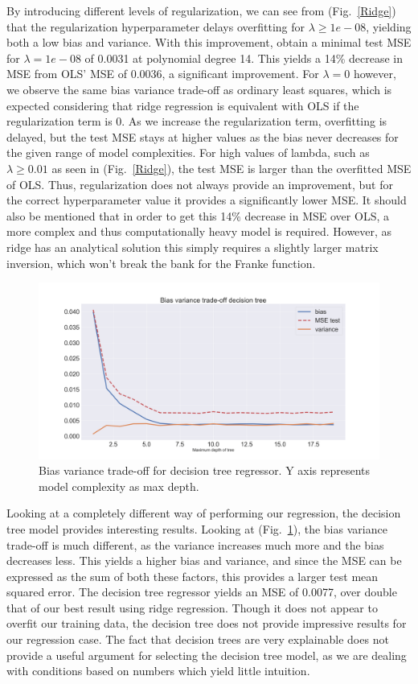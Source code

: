 \documentclass[onecolumn,10pt,cleanfoot]{asme2ej}
\begin{document}
By introducing different levels of regularization, we can see from (Fig.~\ref{Ridge}) that the regularization hyperparameter delays overfitting for $\lambda \geq 1e-08$, yielding both a low bias and variance. With this improvement, obtain a minimal test MSE for $\lambda = 1e-08$ of 0.0031 at polynomial degree 14. This yields a 14\% decrease in MSE from OLS' MSE of 0.0036, a significant improvement. For $\lambda = 0$ however, we observe the same bias variance trade-off as ordinary least squares, which is expected considering that ridge regression is equivalent with OLS if the regularization term is 0. As we increase the regularization term, overfitting is delayed, but the test MSE stays at higher values as the bias never decreases for the given range of model complexities. For high values of lambda, such as $\lambda \geq 0.01$ as seen in (Fig.~\ref{Ridge}), the test MSE is larger than the overfitted MSE of  OLS. Thus, regularization does not always provide an improvement, but for the correct hyperparameter value it provides a significantly lower MSE. It should also be mentioned that in order to get this 14\% decrease in MSE over OLS, a more complex and thus computationally heavy model is required. However, as ridge has an analytical solution this simply requires a slightly larger matrix inversion, which won't break the bank for the Franke function.

\begin{figure}[H]
\centerline{\includegraphics[width=5in]{figs/BV_Decison_tree.png}}
\caption{Bias variance trade-off for decision tree regressor. Y axis represents model complexity as max depth.}
\label{tree}
\end{figure}

Looking at a completely different way of performing our regression, the decision tree model provides interesting results. Looking at (Fig.~\ref{tree}), the bias variance trade-off is much different, as the variance increases much more and the bias decreases less. This yields a higher bias and variance, and since the MSE can be expressed as the sum of both these factors, this provides a larger test mean squared error. The decision tree regressor yields an MSE of 0.0077, over double that of our best result using ridge regression. Though it does not appear to overfit our training data, the decision tree does not provide impressive results for our regression case. The fact that decision trees are very explainable does not provide a useful argument for selecting the decision tree model, as we are dealing with conditions based on numbers which yield little intuition.
\end{document}
